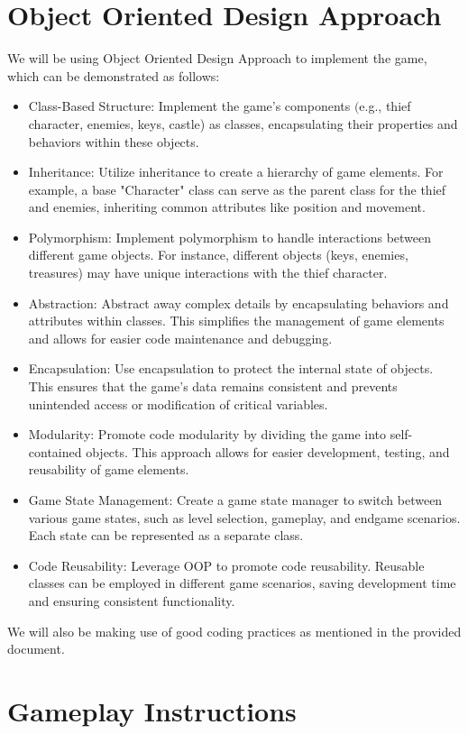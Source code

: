 \documentclass[12pt,a4paper]{article}
\begin{document}
\section{Object Oriented Design Approach}\label{sec:oop approach}
We will be using Object Oriented Design Approach to implement the game, which can be demonstrated as follows:
\begin{itemize}
\item Class-Based Structure: Implement the game's components $($e.g., thief character, enemies, keys, castle) as classes, encapsulating their properties and behaviors within these objects.
\item Inheritance: Utilize inheritance to create a hierarchy of game elements. For example, a base "Character" class can serve as the parent class for the thief and enemies, inheriting common attributes like position and movement.
\item Polymorphism: Implement polymorphism to handle interactions between different game objects. For instance, different objects (keys, enemies, treasures) may have unique interactions with the thief character.
\item Abstraction: Abstract away complex details by encapsulating behaviors and attributes within classes. This simplifies the management of game elements and allows for easier code maintenance and debugging.
\item Encapsulation: Use encapsulation to protect the internal state of objects. This ensures that the game's data remains consistent and prevents unintended access or modification of critical variables.
\item Modularity: Promote code modularity by dividing the game into self-contained objects. This approach allows for easier development, testing, and reusability of game elements.
\item Game State Management: Create a game state manager to switch between various game states, such as level selection, gameplay, and endgame scenarios. Each state can be represented as a separate class.
\item Code Reusability: Leverage OOP to promote code reusability. Reusable classes can be employed in different game scenarios, saving development time and ensuring consistent functionality.
\end{itemize}
We will also be making use of good coding practices as mentioned in the provided document.

\section{Gameplay Instructions}\label{sec:game instructions}
\end{document}
